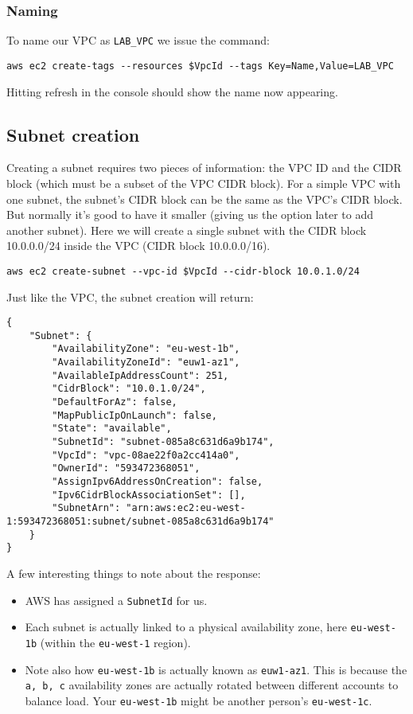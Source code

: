 \subsubsection{Naming}

To name our VPC as \texttt{LAB\_VPC} we issue the command:

\begin{verbatim}
aws ec2 create-tags --resources $VpcId --tags Key=Name,Value=LAB_VPC
\end{verbatim}

Hitting refresh in the console should show the name now appearing.

\subsection{Subnet creation}\label{subnet-creation}

Creating a subnet requires two pieces of information: the VPC ID and the
CIDR block (which must be a subset of the VPC CIDR block). For a simple
VPC with one subnet, the subnet's CIDR block can be the same as the
VPC's CIDR block. But normally it's good to have it smaller (giving us
the option later to add another subnet). Here we will create a single
subnet with the CIDR block 10.0.0.0/24 inside the VPC (CIDR block
10.0.0.0/16).

\begin{verbatim}
aws ec2 create-subnet --vpc-id $VpcId --cidr-block 10.0.1.0/24
\end{verbatim}

Just like the VPC, the subnet creation will return:

\begin{verbatim}
{
    "Subnet": {
        "AvailabilityZone": "eu-west-1b",
        "AvailabilityZoneId": "euw1-az1",
        "AvailableIpAddressCount": 251,
        "CidrBlock": "10.0.1.0/24",
        "DefaultForAz": false,
        "MapPublicIpOnLaunch": false,
        "State": "available",
        "SubnetId": "subnet-085a8c631d6a9b174",
        "VpcId": "vpc-08ae22f0a2cc414a0",
        "OwnerId": "593472368051",
        "AssignIpv6AddressOnCreation": false,
        "Ipv6CidrBlockAssociationSet": [],
        "SubnetArn": "arn:aws:ec2:eu-west-1:593472368051:subnet/subnet-085a8c631d6a9b174"
    }
}
\end{verbatim}

A few interesting things to note about the response:

\begin{itemize}
\item
  AWS has assigned a \texttt{SubnetId} for us.
\item
  Each subnet is actually linked to a physical availability zone, here
  \texttt{eu-west-1b} (within the \texttt{eu-west-1} region).
\item
  Note also how \texttt{eu-west-1b} is actually known as
  \texttt{euw1-az1}. This is because the \texttt{a,\ b,\ c} availability
  zones are actually rotated between different accounts to balance load.
  Your \texttt{eu-west-1b} might be another person's
  \texttt{eu-west-1c}.
\end{itemize}

